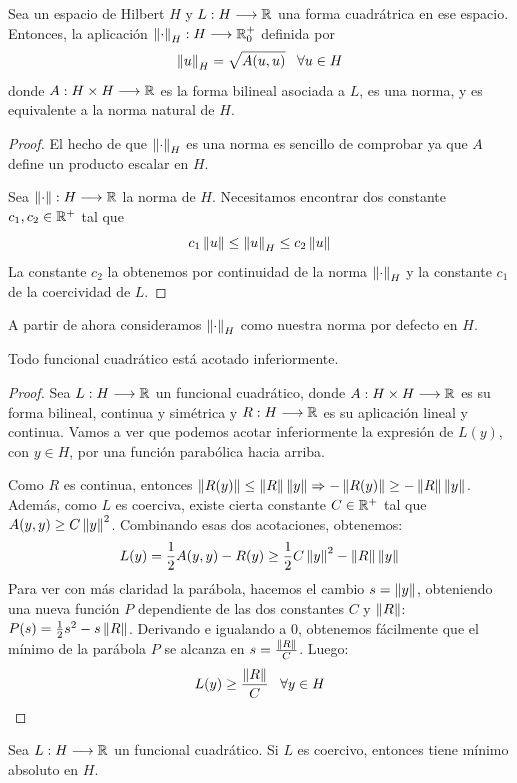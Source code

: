 \begin{prop}
Sea un espacio de Hilbert $H$ y $L : H \longrightarrow \mathbb{R}$ una forma cuadrátrica en ese espacio.
Entonces, la aplicación $\left\lVert\cdot\right\rVert_H : H \longrightarrow \mathbb{R}^+_0$ definida por 
\[
\left\lVert u\right\rVert_H=\sqrt{A(u,u)} \;\;\; \forall u\in H
\]
donde $A : H\times H \longrightarrow \mathbb{R}$ es la forma bilineal asociada a $L$, es una norma, y es equivalente a la norma natural de $H$.
\end{prop}
\begin{proof}
El hecho de que $\left\lVert\cdot\right\rVert_H$ es una norma es sencillo de comprobar ya que $A$ define un producto escalar en $H$.

Sea $\left\lVert\cdot\right\rVert : H \longrightarrow \mathbb{R}$ la norma de $H$. Necesitamos encontrar dos constante $c_1,c_2\in\mathbb{R}^+$ tal que 
\[
c_1\left\lVert u\right\rVert\leq \left\lVert u\right\rVert_H \leq c_2\left\lVert u\right\rVert
\]
La constante $c_2$ la obtenemos por continuidad de la norma $\left\lVert\cdot\right\rVert_H$ y la constante $c_1$ de la coercividad de $L$.

\end{proof}
A partir de ahora consideramos $\left\lVert\cdot\right\rVert_H$ como nuestra norma por defecto en $H$.
\begin{prop}
Todo funcional cuadrático está acotado inferiormente.
\end{prop}
\begin{proof}
Sea $L : H \longrightarrow \mathbb{R}$ un funcional cuadrático, donde $A : H\times H \longrightarrow \mathbb{R}$ es su forma bilineal, continua y simétrica y $R : H \longrightarrow \mathbb{R}$ es su aplicación lineal y continua.
Vamos a ver que podemos acotar inferiormente la expresión de $L(y)$, con $y\in H$, por una función parabólica hacia arriba.

Como $R$ es continua, entonces $\left\lVert R(y)\right\rVert\leq \left\lVert R\right\rVert\left\lVert y\right\rVert \Rightarrow -\left\lVert R(y)\right\rVert \geq -\left\lVert R\right\rVert\left\lVert y\right\rVert$. Además, como $L$ es coerciva, existe cierta constante $C\in\mathbb{R}^+$ tal que $A(y,y)\geq C\left\lVert y\right\rVert^2$. Combinando esas dos acotaciones, obtenemos:
\[
L(y)=\frac{1}{2}A(y,y)-R(y)\geq \frac{1}{2}C\left\lVert y\right\rVert^2-\left\lVert R\right\rVert\left\lVert y\right\rVert
\]
Para ver con más claridad la parábola, hacemos el cambio $s=\left\lVert y\right\rVert$, obteniendo una nueva función $P$ dependiente de las dos constantes $C$ y $\left\lVert R\right\rVert$: $P(s)=\frac{1}{2}s^2-s\left\lVert R\right\rVert$. Derivando e igualando a 0, obtenemos fácilmente que el mínimo de la parábola $P$ se alcanza en $s=\frac{\left\lVert R\right\rVert}{C}$. Luego:
\[
L(y)\geq \frac{\left\lVert R\right\rVert}{C} \;\;\; \forall y\in H 
\]

\end{proof}

\begin{theorem}
\label{laxmilgran}
Sea $L : H \longrightarrow \mathbb{R}$ un funcional cuadrático. Si $L$ es coercivo, entonces tiene mínimo absoluto en $H$.
\end{theorem}

